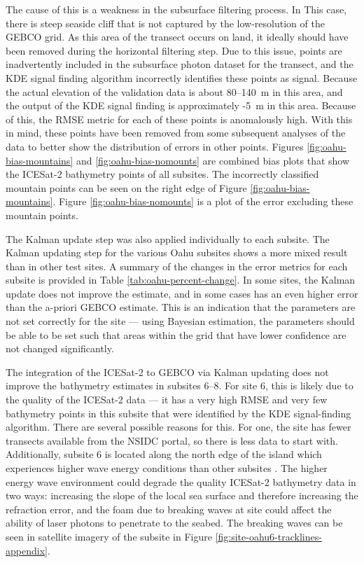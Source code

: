 The cause of this is a weakness in the subsurface filtering process. In This case, there is steep seaside cliff that is not captured by the low-resolution of the GEBCO grid. As this area of the transect occurs on land, it ideally should have been removed during the horizontal filtering step. Due to this issue, points are inadvertently included in the subsurface photon dataset for the transect, and the KDE signal finding algorithm incorrectly identifies these points as signal. Because the actual elevation of the validation data is about 80--140~m in this area, and the output of the KDE signal finding is approximately -5~m in this area. Because of this, the RMSE metric for each of these points is anomalously high. With this in mind, these points have been removed from some subsequent analyses of the data to better show the distribution of errors in other points. Figures \ref{fig:oahu-bias-mountains} and \ref{fig:oahu-bias-nomounts} are combined bias plots that show the ICESat-2 bathymetry points of all subsites. The incorrectly classified mountain points can be seen on the right edge of Figure \ref{fig:oahu-bias-mountains}. Figure \ref{fig:oahu-bias-nomounts} is a plot of the error excluding these mountain points.

The Kalman update step was also applied individually to each subsite. The Kalman updating step for the various Oahu subsites shows a more mixed result than in other test sites. A summary of the changes in the error metrics for each subsite is provided in Table \ref{tab:oahu-percent-change}. In some sites, the Kalman update does not improve the estimate, and in some cases has an even higher error than the a-priori GEBCO estimate. This is an indication that the parameters are not set correctly for the site --- using Bayesian estimation, the parameters should be able to be set such that areas within the grid that have lower confidence are not changed significantly.

The integration of the ICESat-2 to GEBCO via Kalman updating does not improve the bathymetry estimates in subsites 6--8. For site 6, this is likely due to the quality of the ICESat-2 data --- it has a very high RMSE and very few bathymetry points in this subsite that were identified by the KDE signal-finding algorithm. There are several possible reasons for this. For one, the site has fewer transects available from the NSIDC portal, so there is less data to start with. Additionally, subsite 6 is located along the north edge of the island which experiences higher wave energy conditions than other subsites \parencite{Vitousek2008a}. The higher energy wave environment could degrade the quality ICESat-2 bathymetry data in two ways: increasing the slope of the local sea surface and therefore increasing the refraction error, and the foam due to breaking waves at site could affect the ability of laser photons to penetrate to the seabed. The breaking waves can be seen in satellite imagery of the subsite in Figure \ref{fig:site-oahu6-tracklines-appendix}.

